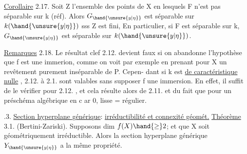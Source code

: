 
\uline{Corollaire} 2.17.   Soit Z l'ensemble des points de X en lesquels F
n'est pas séparable sur k (réf). Alors  $G_{\hand{\unsure{y|\eta}}}$ est séparable sur $k(\hand{\unsure{y|\eta}})$ sss
Z est fini, En particulier, si F est séparable sur k, $G_{\hand{\unsure{y|\eta}}}$ est séparable
sur $k(\hand{\unsure{y|\eta}})$.

\uline{Remarques} 2.18.  Le résultat clef  2.12.  devient faux si on abandonne
l'hypothèse que f est une immerion, comme  on voit par exemple en
prenant pour  X un revêtement purement inséparable de P.   Cepen-%
dant 
  si  k est \uline{de caractéristique nulle} ,  2.12. à
2.1. sont valables sans supposer f une immersion.  En effet, il suffit
de le vérifier pour 2.12. , et  cela résulte alors de 2.11. et du fait
que  pour un préschéma algébrique en c ar 0,  lisse = régulier.


.3.   \uline{Section hyperplane générique}: \uline{irréductibilité et connexité géomét.}
\uline{Théorème} 3.1. (Bertini-Zariski).  Supposons dim $f(X) \hand{\geq} 2$; et que X
soit  géométriquement irréductible\deleted{)}. Alors
la section hyperplane générique $Y_{\hand{\unsure{y|\eta}}}$ a la même propriété.



